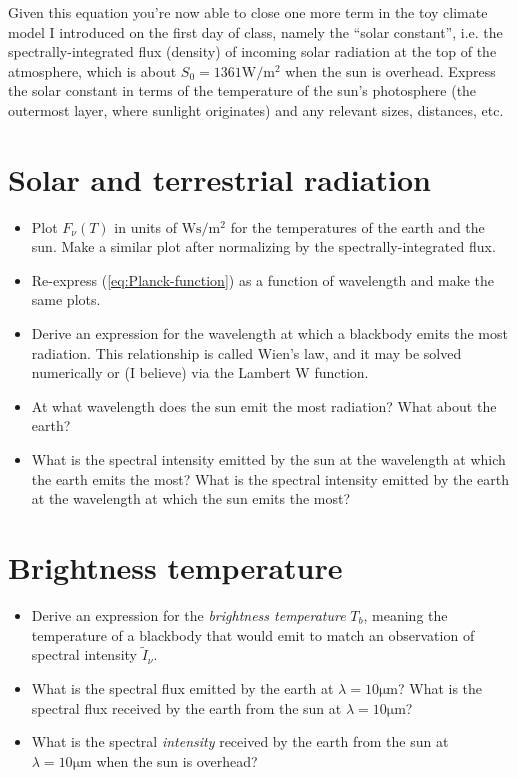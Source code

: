 \documentclass{article}
\begin{document}
Given this equation you're now able to close one more term in the toy climate model I introduced on the first day of class, namely the ``solar constant'', i.e. the spectrally-integrated flux (density) of incoming solar radiation at the top of the atmosphere, which is about $S_0 = 1361 \si{\watt\per\square\meter}$ when the sun is overhead. Express the solar constant in terms of the temperature of the sun's photosphere (the outermost layer, where sunlight originates) and any relevant sizes, distances, etc. 
\section{Solar and terrestrial radiation}

\begin{itemize}
\item Plot $F_{\nu}(T)$ in units of $\si{\watt\second\per\square\meter}$ for the temperatures of the earth and the sun. Make a similar plot after normalizing by the spectrally-integrated flux. 
\item Re-express (\ref{eq:Planck-function}) as a function of wavelength and make the same plots. 
\item Derive an expression for the wavelength at which a blackbody emits the most radiation. This relationship is called Wien's law, and it may be solved numerically or (I believe) via the Lambert W function. 
\item  At what wavelength does the sun emit the most radiation? What about the earth? 
\item What is the spectral intensity emitted by the sun at the wavelength at which the earth emits the most? What is the spectral intensity emitted by the earth at the wavelength at which the sun emits the most? 
\end{itemize} 

\section{Brightness temperature }

\begin{itemize}
\item Derive an expression for the {\it brightness temperature} $T_b$, meaning the temperature of a blackbody that would emit to match an observation of spectral intensity $\tilde{I}_{\nu}$. 
\item What is the spectral flux emitted by the earth at $\lambda = 10 \si{\micro\meter}$? What is the spectral flux received by the earth from the sun at $\lambda = 10 \si{\micro\meter}$? 
\item What is the spectral {\it intensity} received by the earth from the sun at $\lambda = 10 \si{\micro\meter}$ when the sun is overhead? 
\end{itemize}

\end{document}
